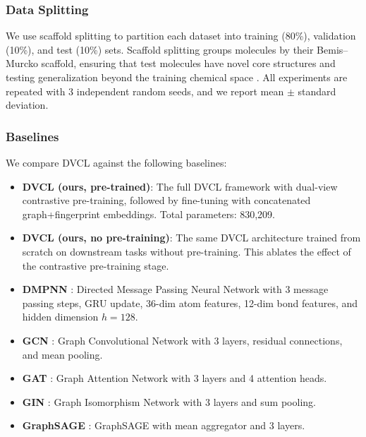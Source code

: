 \documentclass[a4paper,fleqn]{cas-sc}
\begin{document}
\subsubsection{Data Splitting}

We use scaffold splitting \citep{bemis1996properties} to partition each dataset into training (80\%), validation (10\%), and test (10\%) sets. Scaffold splitting groups molecules by their Bemis--Murcko scaffold, ensuring that test molecules have novel core structures and testing generalization beyond the training chemical space \citep{hu2020strategies}. All experiments are repeated with 3 independent random seeds, and we report mean $\pm$ standard deviation.

\subsubsection{Baselines}

We compare DVCL against the following baselines:

\begin{itemize}
\item \textbf{DVCL (ours, pre-trained)}: The full DVCL framework with dual-view contrastive pre-training, followed by fine-tuning with concatenated graph+fingerprint embeddings. Total parameters: 830,209.

\item \textbf{DVCL (ours, no pre-training)}: The same DVCL architecture trained from scratch on downstream tasks without pre-training. This ablates the effect of the contrastive pre-training stage.

\item \textbf{DMPNN} \citep{yang2019analyzing}: Directed Message Passing Neural Network with 3 message passing steps, GRU update, 36-dim atom features, 12-dim bond features, and hidden dimension $h = 128$.

\item \textbf{GCN} \citep{kipf2017semi}: Graph Convolutional Network with 3 layers, residual connections, and mean pooling.

\item \textbf{GAT} \citep{velickovic2018graph}: Graph Attention Network with 3 layers and 4 attention heads.

\item \textbf{GIN} \citep{xu2018powerful}: Graph Isomorphism Network with 3 layers and sum pooling.

\item \textbf{GraphSAGE} \citep{hamilton2017inductive}: GraphSAGE with mean aggregator and 3 layers.
\end{itemize}
\end{document}
